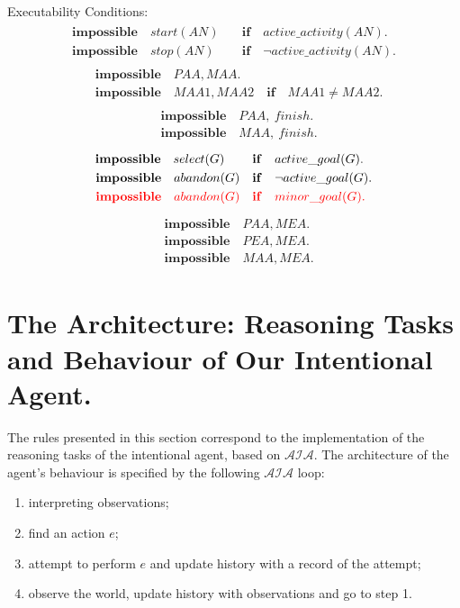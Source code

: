 \documentclass[11pt, oneside]{article}
\begin{document}
Executability Conditions:
\begin{align}\begin{split}
\mathbf{impossible}\quad  start(AN)\quad  & \mathbf{if}\quad active\_activity(AN). \\
\mathbf{impossible}\quad  stop(AN)\ \quad  & \mathbf{if}\quad  \neg active\_activity(AN). 
\end{split}\end{align}
\begin{align}\begin{split}
&\mathbf{impossible}\quad  PAA, MAA. \\
&\mathbf{impossible}\quad  MAA1, MAA2\quad \mathbf{if} \quad MAA1\neq MAA2.
\end{split}\end{align}
\begin{align}\begin{split}
&\mathbf{impossible}\quad  PAA, \ finish. \\
&\mathbf{impossible}\quad  MAA, \ finish.
\end{split}\end{align}
\begin{align}\begin{split}
\mathbf{impossible}\quad select(G)\ \ \ \:\quad &\mathbf{if} \quad active\_goal(G). \\
\mathbf{impossible}\quad abandon(G) \quad &\mathbf{if} \quad \neg active\_goal(G). \\
\mathbf{\textcolor{red}{impossible}}\quad \textcolor{red}{abandon(G)} \quad &\mathbf{\textcolor{red}{if}} \quad \textcolor{red}{minor\_goal(G).}
\end{split}\end{align}
\begin{align}\begin{split}
&\mathbf{impossible}\quad  PAA, MEA. \\
&\mathbf{impossible}\quad  PEA, MEA. \\
&\mathbf{impossible}\quad  MAA, MEA. 
\end{split}\end{align}

\section{The Architecture: Reasoning Tasks and Behaviour of Our Intentional Agent.} 
The rules presented in this section correspond to the implementation of the reasoning tasks of the intentional agent, based on $\mathcal{AIA}$. The architecture of the agent's behaviour is specified by the following $\mathcal{AIA}$ loop:
\begin{enumerate}
\item interpreting observations;
\item find an  action $e$;
\item attempt to perform $e$ and update history with a record of the attempt;
\item observe the world, update history with observations and go to step 1.
\end{enumerate}
\end{document}
